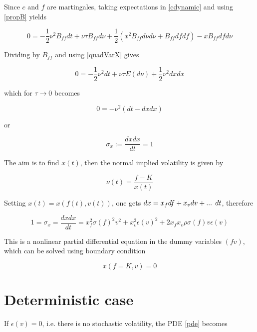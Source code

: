 \documentclass{amsart}
\theoremstyle{plain}
\numberwithin{equation}{section}
\begin{document}
Since $c$ and $f$ are martingales, taking expectations in \ref{cdynamic} and using \ref{propB} yields

\begin{equation}
0 = -\frac{1}{2} \nu^2 B_{ff} dt + \nu \tau B_{ff} d\nu  + \frac{1}{2} \left( x^2 B_{ff} d\nu d\nu + B_{ff} df df \right)
       - x B_{ff} df d\nu
\end{equation}

Dividing by $B_{ff}$ and using \ref{quadVarX} gives

\begin{equation}
0 = -\frac{1}{2} \nu^2 dt + \nu \tau E(d\nu) + \frac{1}{2} \nu^2 dx dx 
\end{equation}

which for $\tau \rightarrow 0$ becomes

\begin{equation}
0 = - \nu^2 ( dt - dx dx )
\end{equation}

or

\begin{equation}
\sigma_x := \frac{dx dx}{dt} = 1
\end{equation}

The aim is to find $x(t)$, then the normal implied volatility is given by

\begin{equation}
\nu(t) = \frac{f-K}{x(t)} 
\end{equation}

Setting $x(t) = x(f(t),v(t))$, one gets $dx=x_fdf+x_vdv+\textnormal{... }dt$, therefore

\begin{equation}\label{pde}
1 = \sigma_x = \frac{dx dx}{dt} = x_f^2\sigma(f)^2v^2+x_v^2\epsilon(v)^2+2x_fx_v\rho\sigma(f) v \epsilon(v)
\end{equation}

This is a nonlinear partial differential equation in the dummy variables $(fv)$, which can be solved using boundary condition

\begin{equation}
x(f=K,v) = 0
\end{equation}

\section{Deterministic case}

If $\epsilon(v)=0$, i.e. there is no stochastic volatility, the PDE \ref{pde} becomes
\end{document}
